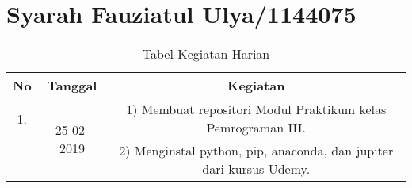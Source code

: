 \chapter{Syarah Fauziatul Ulya/1144075}
\begin{table}[h]
\caption{Tabel Kegiatan Harian}
\centering
\begin{tabular}{|c|c|c|}
\hline
No&Tanggal&Kegiatan\\
\hline
1.&\multirow{2}{*}{25-02-2019}&1) Membuat repositori Modul Praktikum kelas Pemrograman III.\\
&&2) Menginstal python, pip, anaconda, dan jupiter dari kursus Udemy.\\
\hline
\end{tabular}
\label{table:contoh}
\end{table}
